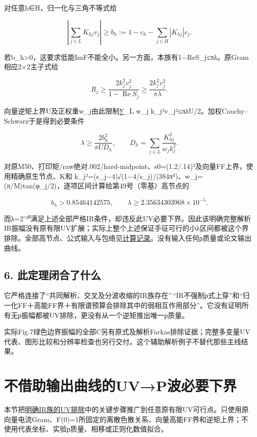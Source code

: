 \documentclass[
  10pt,
  a4paper,
]{article}
\begin{document}
对任意h∈H，归一化与三角不等式给

\[
\left|\sum_{j\in L}K_{hj}v_j\right|\ge
b_h:=1-c_h-\sum_{j\in H}|K_{hj}|c_j.
\]

若b\_h\textgreater0，这要求低能ImF不能全小。另一方面，本族有1−ReS\_j≤πλ。原Gram相应2×2主子式给

\[
R_j\ge\frac{2k_j^2v_j^2}{1-\operatorname{Re}S_j}
\ge\frac{2k_j^2v_j^2}{\pi\lambda}.
\]

向量逆矩上界U及正权重w\_j由此限制∑\_L w\_j
k\_j²v\_j²≤πλU/2。加权Cauchy--Schwarz于是得到必要条件

\[
\lambda\ge\frac{2b_h^2}{\pi U D_h},\qquad
D_h=\sum_{j\in L}\frac{K_{hj}^2}{w_jk_j^2}.
\]

对原M50、打印矩/raw绝对.002/hard-midpoint、s0=(1.2/.14)²及向量FF上界，使用精确原生节点、K和
k\_j²=(s\_j−4)√(1−4/s\_j)/(384π⁵)、w\_j=(π/M)tan(φ\_j/2)，逐项区间计算给第49号（零基）高节点的

\[
b_h>0.85464142575,\qquad
\lambda\ge2.35634303968\times10^{-5}.
\]

而λ=2⁻³⁰满足上述全部严格IR条件，却违反此UV必要下界。因此该明确完整解析IR振幅没有原有限UV扩展；实际上整个上述保证手征可行的小λ区间都被这个界排除。全部高节点、公式输入与包络见\href{../../../GLOBAL_IR_UV_EXCLUSION.json}{计算记录}。没有输入任何ρ质量或论文输出曲线。

\subsection{6.
此定理闭合了什么}\label{ux6b64ux5b9aux7406ux95edux5408ux4e86ux4ec0ux4e48}

它严格连接了``共同解析、交叉及分波收缩的IR族存在''\,``IR不强制ρ式上穿''和``归一化FF＋高能FF界＋有限谱预算会排除其中的弱相互作用部分''。它没有证明所有无ρ振幅都被UV排除，更没有从一个逆矩推出唯一ρ质量。

实际Fig.7绿色边界振幅的全部C另有原式及解析Farkas排除证据；完整多变量UV代表、图形比较和分辨率检查也另行交付。这个辅助解析例子不替代那些主线结果。

\newpage

\section{不借助输出曲线的UV→P波必要下界}\label{ux4e0dux501fux52a9ux8f93ux51faux66f2ux7ebfux7684uvpux6ce2ux5fc5ux8981ux4e0bux754c}

本节把\href{../../../../../evidence/GLOBAL_IR_SEED_AND_UV_OBSTRUCTION_20260911.md}{明确IR族的UV排除}中的关键步骤推广到任意原有限UV可行点。只使用原向量电流Gram、F(0)=1所固定的离散色散关系、向量高能FF界和逆矩上界；不使用代表坐标、实验ρ质量、相移或正则化数值拟合。
\end{document}
